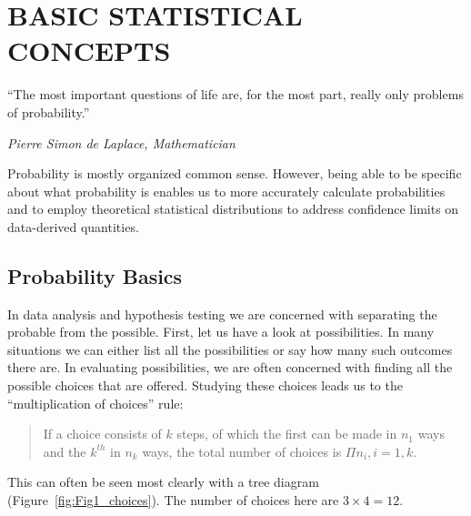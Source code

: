 %
\chapter{BASIC STATISTICAL CONCEPTS}
\label{ch:basics}
\epigraph{``The most important questions of life are, for the most part, really only problems of probability.''}{\textit{Pierre Simon de Laplace, Mathematician}}

Probability is mostly organized common sense.  However, being able to be specific about what probability is
enables us to more accurately calculate probabilities and to employ theoretical statistical distributions to
address confidence limits on data-derived quantities.

\section{Probability Basics}

	In data analysis and hypothesis testing we are concerned with separating the probable from 
the possible.  First, let us have a look at possibilities.  In many situations we can either list all the 
possibilities or say how many such outcomes there are.  In evaluating possibilities, we are often 
concerned with finding all the possible choices that are offered.  Studying these choices leads us 
to the ``multiplication of choices'' rule:
\begin{quote}
If a choice consists of $k$ steps, of which the first can be made in $n_1$ ways and 
the $k^{th}$ in $n_k$ ways, the total number of choices is $\Pi n_{i}, i = 1,k$.
\end{quote}
This can often be seen most clearly with a tree diagram (Figure~\ref{fig:Fig1_choices}).
The number of choices here are $3 \times 4 = 12$.


